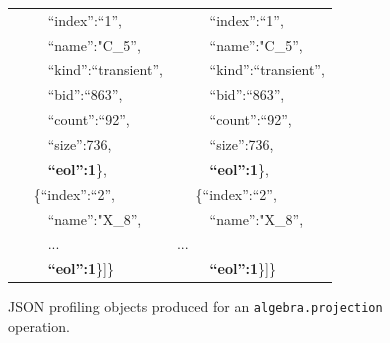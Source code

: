 \documentclass[conference]{IEEEtran}
\begin{document}
\begin{figure}[t]
{\begin{tabular}{|l@{~}l|}
 ~~~~   ``index'':``1'',                                  &   ~~~~    ``index'':``1'',                                   \\
 ~~~~   ``name'':"C\_5'',                                 &   ~~~~    ``name'':"C\_5'',                                  \\
 ~~~~   ``kind'':``transient'',                           &   ~~~~    ``kind'':``transient'',                            \\
 ~~~~   ``bid'':``863'',                                  &   ~~~~    ``bid'':``863'',                                   \\
 ~~~~   ``count'':``92'',                                 &   ~~~~    ``count'':``92'',                                  \\
 ~~~~   ``size'':736,                                     &   ~~~~    ``size'':736,                                      \\
 ~~~~   \textbf{``eol'':1}\},                             &   ~~~~    \textbf{``eol'':1}\},                              \\
 ~~  \{``index'':``2'',                                   &   ~~   \{``index'':``2'',                                    \\
 ~~~~   ``name'':"X\_8'',                                 &   ~~~~    ``name'':"X\_8'',                                  \\
 ~~~~   ...                                               &   ...                                                        \\
 ~~~~   \textbf{``eol'':1}\}]\}                           &   ~~~~    \textbf{``eol'':1}\}]\}                            \\
\hline
\end{tabular}
}
\caption{JSON profiling objects produced for an \texttt{\small algebra.projection} operation.}
\label{fig:json_obj}
\end{figure}
\end{document}
